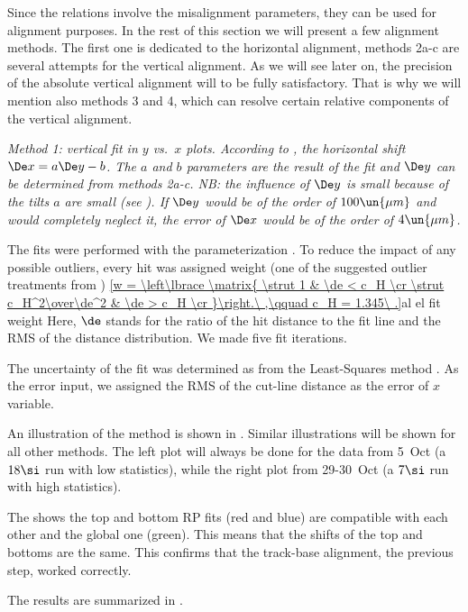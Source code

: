 Since the relations  involve the misalignment parameters, they can be used for alignment purposes. In the rest of this section we will present a few alignment methods. The first one is dedicated to the horizontal alignment, methods 2a-c are several attempts for the vertical alignment. As we will see later on, the precision of the absolute vertical alignment will to be fully satisfactory. That is why we will mention also methods 3 and 4, which can resolve certain relative components of the vertical alignment.

\em{Method 1}: vertical fit in $y$ vs.~$x$ plots. According to , the horizontal shift $\De x = a \De y - b$. The $a$ and $b$ parameters are the result of the fit and $\De y$ can be determined from methods 2a-c. NB: the influence of $\De y$ is small because of the tilts $a$ are small (see ). If $\De y$ would be of the order of $100\un{\mu m}$ and would completely neglect it, the error of $\De x$ would be of the order of $4\un{\mu m}$.

The fits were performed with the parameterization . To reduce the impact of any possible outliers, every hit was assigned weight (one of the suggested outlier treatments from )
\eqref{w = \left\lbrace \matrix{
\strut 1				& \de < c_H \cr
\strut c_H^2\over\de^2	& \de > c_H \cr
}\right.\ ,\qquad c_H = 1.345\ .}{al el fit weight}
Here, $\de$ stands for the ratio of the hit distance to the fit line and the RMS of the distance distribution. We made five fit iterations.

The uncertainty of the fit was determined as from the Least-Squares method . As the error input, we assigned the RMS of the cut-line distance as the error of $x$ variable.

An illustration of the method is shown in . Similar illustrations will be shown for all other methods. The left plot will always be done for the data from 5~Oct (a $18\si$ run with low statistics), while the right plot from 29-30~Oct (a $7\si$ run with high statistics).

The  shows the top and bottom RP fits (red and blue) are compatible with each other and the global one (green). This means that the shifts of the top and bottoms are the same. This confirms that the track-base alignment, the previous step, worked correctly.

The results are summarized in .


